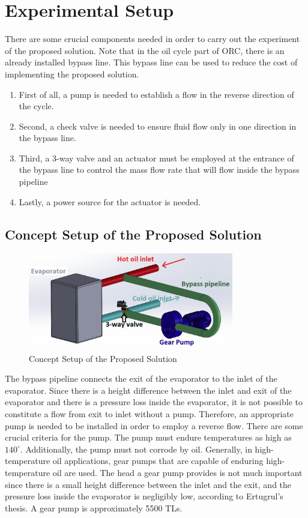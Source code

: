 \chapter{Experimental Setup}

There are some crucial components needed in order to carry out the experiment of the proposed solution. Note that in the oil cycle part of ORC, there is an already installed bypass line. This bypass line can be used to reduce the cost of implementing the proposed solution.

\begin{enumerate}
    \item First of all, a pump is needed to establish a flow in the reverse direction of the cycle.
    \item Second, a check valve is needed to ensure fluid flow only in one direction in the bypass line.
    \item Third, a 3-way valve and an actuator must be employed at the entrance of the bypass line to control the mass flow rate that will flow inside the bypass pipeline
    \item Lastly, a power source for the actuator is needed.
\end{enumerate}

\section{Concept Setup of the Proposed Solution}

\begin{figure}[H]
		\centering
		\includegraphics[width=0.8\textwidth]{images/tasarim.jpg}
		\caption[Concept Setup of the Proposed Solution]{Concept Setup of the Proposed Solution}
		\label{concept} 
\end{figure} 

The bypass pipeline connects the exit of the evaporator to the inlet of the evaporator. Since there is a height difference between the inlet and exit of the evaporator and there is a pressure loss inside the evaporator, it is not possible to constitute a flow from exit to inlet without a pump. Therefore, an appropriate pump is needed to be installed in order to employ a reverse flow. There are some crucial criteria for the pump. The pump must endure temperatures as high as $140^\circ$. Additionally, the pump must not corrode by oil. Generally, in high-temperature oil applications, gear pumps that are capable of enduring high-temperature oil are used. The head a gear pump provides is not much important since there is a small height difference between the inlet and the exit, and the pressure loss inside the evaporator is negligibly low, according to Ertugrul's thesis. A gear pump is approximately 5500 TLs.

